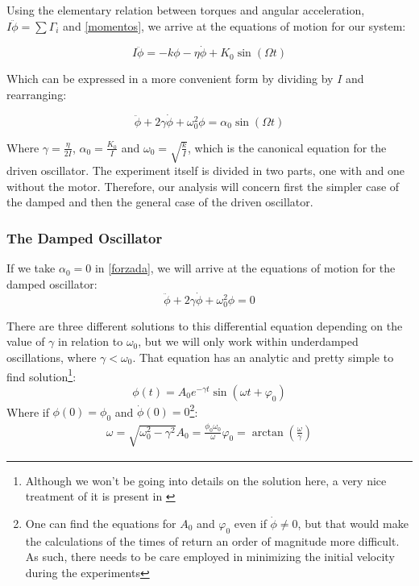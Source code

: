 \documentclass[a4paper,12pt]{article}
\begin{document}
Using the elementary relation between torques and angular acceleration, $I \ddot{\phi} = \sum \Gamma_i$ and \eqref{momentos}, we arrive at the equations of motion for our system:

$$I \ddot{\phi} = -k\phi -\eta \dot{\phi} + K_0 \sin(\Omega t)$$

Which can be expressed in a more convenient form by dividing by $I$ and rearranging:

\begin{equation}
\label{forzada}
    \ddot{\phi} + 2\gamma \dot{\phi} + \omega_0^2 \phi= \alpha_0 \sin(\Omega t)
\end{equation}

Where $\gamma = \frac{\eta}{2I}$, $\alpha_0 = \frac{K_0}{I}$ and $\omega_0 = \sqrt{\frac{k}{I}}$, which is the canonical equation for the driven oscillator. The experiment itself is divided in two parts, one with and one without the motor. Therefore, our analysis will concern first the simpler case of the damped and then the general case of the driven oscillator.

\subsubsection{The Damped Oscillator}
If we take $\alpha_0 = 0$ in \eqref{forzada}, we will arrive at the equations of motion for the damped oscillator: 
\begin{equation}
\label{amort}
    \ddot{\phi} + 2\gamma \dot{\phi} +\omega_0^2 \phi = 0 
\end{equation}

There are three different solutions to this differential equation depending on the value of $\gamma$ in relation to $\omega_0$, but we will only work within underdamped oscillations, where $\gamma < \omega_0$. That equation has an analytic and pretty simple to find solution\footnote{Although we won't be going into details on the solution here, a very nice treatment of it is present in \cite[173]{Taylor}}:
\begin{equation}
\label{amortsol}
    \phi (t) = A_0 e^{-\gamma t}\sin(\omega t + \varphi_0)
\end{equation}
Where if $\phi(0) = \phi_0$ and $\dot{\phi}(0) = 0$\footnote{One can find the equations for $A_0$ and $\varphi_0$ even if $\dot{\phi} \neq 0$, but that would make the calculations of the times of return an order of magnitude more difficult. As such, there needs to be care employed in minimizing the initial velocity during the experiments}:
\begin{equation}
\label{IC}
    \begin{gathered}
    \omega = \sqrt{\omega_0^2-\gamma^2}
    A_0 = \frac{\phi_0 \omega_0}{\omega}
    \varphi_0 = \arctan(\frac{\omega}{\gamma})
    \end{gathered}
\end{equation}
\end{document}
